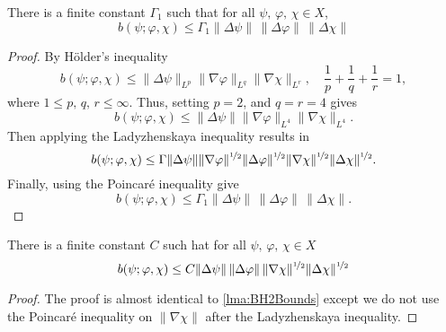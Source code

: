 \begin{lemma} \label{lma:BH2Bounds}
  There is a finite constant $\Gamma_1$ such that for all $\psi,\, \varphi,\,
  \chi \in X$,
  \begin{equation}
    b(\psi;\varphi,\chi) \le \Gamma_1 \|\Delta \psi\|\, \|\Delta \varphi\|\,
      \|\Delta \chi\|
    \label{eqn:BH2Bounds}
  \end{equation}
\end{lemma}
\begin{proof}
  By H\"older's inequality
  \begin{equation}
    b(\psi;\varphi,\chi) \le \|\Delta \psi\|_{L^p} \|\nabla \varphi\|_{L^q}
      \|\nabla \chi\|_{L^r},\quad \frac{1}{p}+\frac{1}{q}+\frac{1}{r}=1,
    \label{eqn:HolderB}
  \end{equation}
  where $1\le p,\,q,\,r\le \infty$. Thus, setting $p = 2$, and $q = r = 4$ gives
  \begin{equation*}
    b(\psi;\varphi,\chi) \le \|\Delta \psi\| \|\nabla \varphi\|_{L^4} \|\nabla
      \chi\|_{L^4}.
  \end{equation*}
  Then applying the Ladyzhenskaya inequality results in
  \begin{equation*}
    b(\psi;\varphi,\chi) \le \Gamma \|\Delta \psi\|
      \|\nabla \varphi\|^{\nicefrac{1}{2}} \|\Delta \varphi\|^{\nicefrac{1}{2}}
      \|\nabla \chi\|^{\nicefrac{1}{2}} \|\Delta \chi\|^{\nicefrac{1}{2}}.
  \end{equation*}
  Finally, using the Poincar\'e inequality give
  \begin{equation*}
    b(\psi;\varphi,\chi) \le \Gamma_1 \|\Delta \psi\|\, \|\Delta \varphi\|\,
      \|\Delta \chi\|.
  \end{equation*}
\end{proof}
\begin{lemma} \label{lma:BH1Bound}
  There is a finite constant $C$ such hat for all $\psi,\, \varphi,\, \chi \in
  X$
  \begin{equation}
    b(\psi;\varphi,\chi) \le C \|\Delta \psi\|\, \|\Delta \varphi\|\,
      \|\nabla \chi\|^{\nicefrac{1}{2}} \|\Delta \chi\|^{\nicefrac{1}{2}}
    \label{eqn:BH1Bound}
  \end{equation}
\end{lemma}
\begin{proof}
  The proof is almost identical to \autoref{lma:BH2Bounds} except we do not
  use the Poincar\'e inequality on $\|\nabla \chi\|$ after the Ladyzhenskaya
  inequality.
\end{proof}

